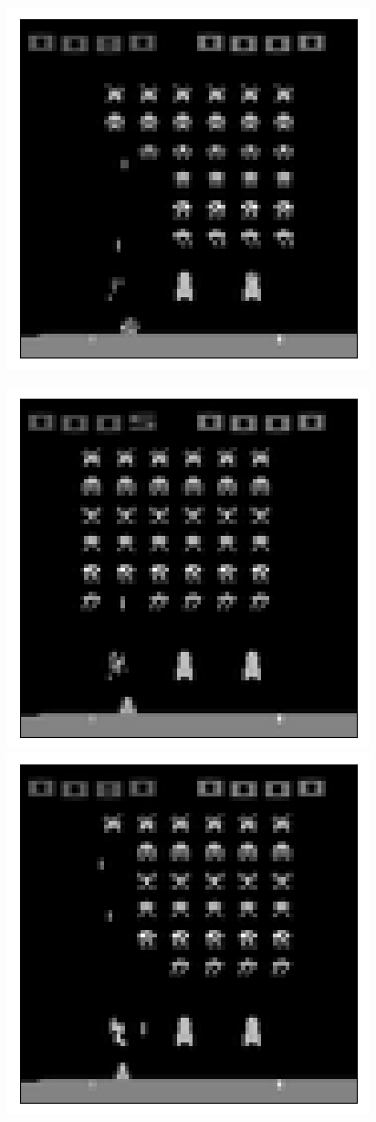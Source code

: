 \begin{figure}[h!]
\begin{multicols}{4}
    \includegraphics[scale=0.4]{figures/results/latent_image/beta_1_sample_3_original.png}
\end{multicols}
\begin{multicols}{4}
    \includegraphics[scale=0.4]{figures/results/latent_image/beta_1_sample_0_reconstructed.png}
    \includegraphics[scale=0.4]{figures/results/latent_image/beta_1_sample_1_reconstructed.png}

\end{multicols}
\end{figure}
